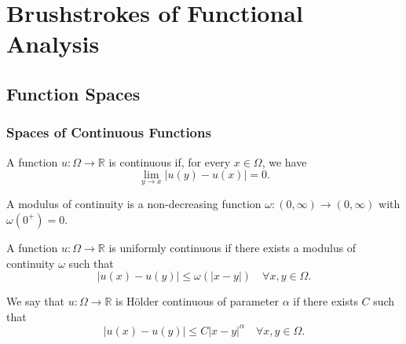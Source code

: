 \chapter{Brushstrokes of Functional Analysis}


\section{Function Spaces}

\subsection{Spaces of Continuous Functions}

\begin{definition}
    A function $u : \Omega \to \mathbb R$ is continuous if, for every $x \in \Omega$, we have
    \begin{equation*}
        \lim_{y \to x} |  u(y) - u(x) | = 0.
    \end{equation*}
\end{definition}

\begin{definition}
    A modulus of continuity is a non-decreasing function $\omega : (0,\infty) \to (0,\infty)$ with $\omega(0^+) = 0$.
\end{definition}

\begin{definition}
    A function $u:\Omega \to \mathbb R$ is uniformly continuous if there exists a modulus of continuity $\omega$ such that
    \begin{equation*}
        |u(x) - u(y)| \le \omega(|x-y|) \quad \forall x,y \in \Omega.
    \end{equation*}
\end{definition}

\begin{definition}
    We say that $u:\Omega \to \mathbb R$ is Hölder continuous of parameter $\alpha$ if there exists $C$ such that
    \begin{equation*}
        |u(x) - u(y)| \le C |x-y|^\alpha \quad \forall x,y \in \Omega.
    \end{equation*}
\end{definition}

